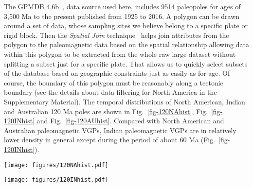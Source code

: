 The GPMDB 4.6b~\cite{P05}, data source used here, includes 9514 paleopoles for
ages of 3,500 Ma to the present published from 1925 to 2016. A polygon can be
drawn around a set of data, whose sampling sites we believe belong to a specific
plate or rigid block. Then the {\em Spatial Join\/} technique~\cite{J07} helps
join attributes from the polygon to the paleomagnetic data based on the spatial
relationship allowing data within this polygon to be extracted from the whole
raw large dataset without splitting a subset just for a specific plate. That
allows us to quickly select subsets of the database based on geographic
constraints just as easily as for age. Of course, the boundary of this polygon
must be reasonably along a tectonic boundary (see the details about data
filtering for North America in the Supplementary Material). The temporal
distributions of North American, Indian and Australian 120 Ma poles
are shown in Fig.~\ref{fig-120NAhist}, Fig.~\ref{fig-120INhist} and
Fig.~\ref{fig-120AUhist}. Compared with North American and Australian
paleomagnetic VGPs, Indian paleomagnetic VGPs are in relatively lower density
in general except during the period of about 60 Ma
(Fig.~\ref{fig-120INhist}).

\begin{figure*}
\centering
\texttt{[image: figures/120NAhist.pdf]}
\caption[Distribution of 120 Ma North American poles]{Temporal
distribution of 120 Ma $NAC$ (101) paleomagnetic poles in 10 Myr
binning and 5 Myr step. For distribution a, each bin only counts in the
midpoints of pole error bars (not including those right at bin edges); For
distribution b, as long as the bar intersects with the bin (not including those
intersecting only at one of bin edges), it is counted in. Inside the
parentheses, i means igneous rocks derived (red bars), r means sedimentary rocks
with redbeds involved derived (orange bars), and m means metamorphic-dominated
rocks derived (blue bars); the left are pure sedimentary rocks derived (black
bars). The midpoints published not later than 1983 are black-dotted.}\label{fig-120NAhist}
\end{figure*}

\begin{figure*}
\centering
\texttt{[image: figures/120INhist.pdf]}
\caption[Distribution of 120 Ma Indian poles]{Temporal distribution
of 120 Ma Indian (501) paleomagnetic poles. See
Fig.~\ref{fig-120NAhist} for more information.}\label{fig-120INhist}
\end{figure*}


